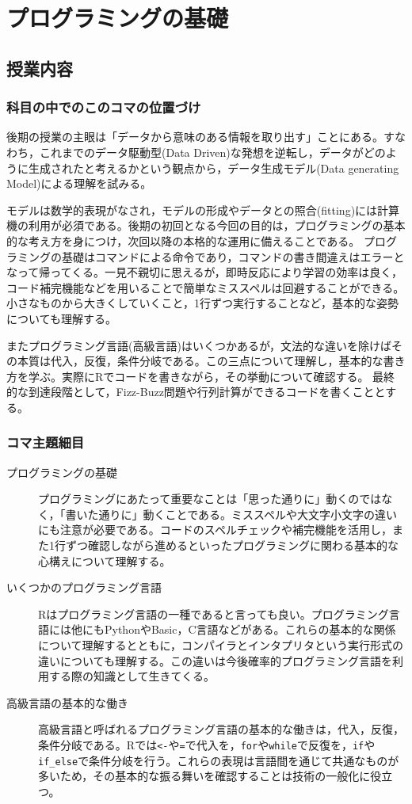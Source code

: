 \section{プログラミングの基礎}
\subsection{授業内容}
\subsubsection{科目の中でのこのコマの位置づけ}
後期の授業の主眼は「データから意味のある情報を取り出す」ことにある。すなわち，これまでのデータ駆動型(Data Driven)な発想を逆転し，データがどのように生成されたと考えるかという観点から，データ生成モデル(Data generating Model)による理解を試みる。

モデルは数学的表現がなされ，モデルの形成やデータとの照合(fitting)には計算機の利用が必須である。後期の初回となる今回の目的は，プログラミングの基本的な考え方を身につけ，次回以降の本格的な運用に備えることである。
プログラミングの基礎はコマンドによる命令であり，コマンドの書き間違えはエラーとなって帰ってくる。一見不親切に思えるが，即時反応により学習の効率は良く，コード補完機能などを用いることで簡単なミススペルは回避することができる。小さなものから大きくしていくこと，1行ずつ実行することなど，基本的な姿勢についても理解する。

またプログラミング言語(高級言語)はいくつかあるが，文法的な違いを除けばその本質は代入，反復，条件分岐である。この三点について理解し，基本的な書き方を学ぶ。実際にRでコードを書きながら，その挙動について確認する。
最終的な到達段階として，Fizz-Buzz問題や行列計算ができるコードを書くこととする。

\subsubsection{コマ主題細目}
\begin{description}
	\item[プログラミングの基礎] プログラミングにあたって重要なことは「思った通りに」動くのではなく，「書いた通りに」動くことである。ミススペルや大文字小文字の違いにも注意が必要である。コードのスペルチェックや補完機能を活用し，また1行ずつ確認しながら進めるといったプログラミングに関わる基本的な心構えについて理解する。

	\item[いくつかのプログラミング言語] Rはプログラミング言語の一種であると言っても良い。プログラミング言語には他にもPythonやBasic，C言語などがある。これらの基本的な関係について理解するとともに，コンパイラとインタプリタという実行形式の違いについても理解する。この違いは今後確率的プログラミング言語を利用する際の知識として生きてくる。

	\item[高級言語の基本的な働き]高級言語と呼ばれるプログラミング言語の基本的な働きは，代入，反復，条件分岐である。Rでは\verb|<-|や\verb|=|で代入を，\verb|for|や\verb|while|で反復を，\verb|if|や\verb|if_else|で条件分岐を行う。これらの表現は言語間を通じて共通なものが多いため，その基本的な振る舞いを確認することは技術の一般化に役立つ。

\end{description}
